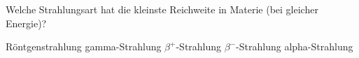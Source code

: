 \documentclass[11pt]{exam}
\begin{document}
\begin{questions}
\vspace{3mm}\question Welche Strahlungsart hat die kleinste Reichweite in Materie (bei gleicher Energie)?

\begin{choices}
	\choice Röntgenstrahlung
	\choice gamma-Strahlung
	\choice \( \beta^+ \)-Strahlung
	\choice \( \beta^- \)-Strahlung
	\choice alpha-Strahlung
\end{choices}

\vspace{3mm}\end{questions}
\end{document}
